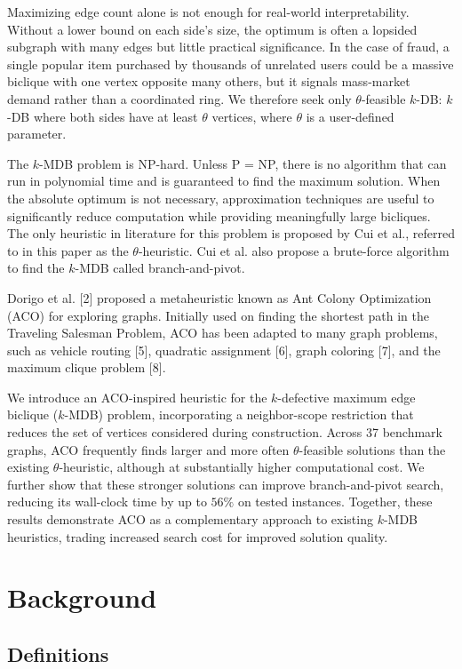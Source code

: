\documentclass[conference]{IEEEtran}
\begin{document}
Maximizing edge count alone is not enough for real-world interpretability. Without a lower bound on each side's size, the optimum is often a lopsided subgraph with many edges but little practical significance. In the case of fraud, a single popular item purchased by thousands of unrelated users could be a massive biclique with one vertex opposite many others, but it signals mass-market demand rather than a coordinated ring. We therefore seek only $\theta$-feasible \mbox{$k$-DB}: \mbox{$k$-DB} where both sides have at least $\theta$ vertices, where $\theta$ is a user-defined parameter.


The $k$-MDB problem is NP-hard. Unless P = NP, there is no algorithm that can run in polynomial time and is guaranteed to find the maximum solution. When the absolute optimum is not necessary, approximation techniques are useful to significantly reduce computation while providing meaningfully large bicliques. The only heuristic in literature for this problem is proposed by Cui et al., referred to in this paper as the $\theta$-heuristic. Cui et al. also propose a brute-force algorithm to find the $k$-MDB called branch-and-pivot.


Dorigo et al. [2] proposed a metaheuristic known as Ant Colony Optimization (ACO) for exploring graphs. Initially used on finding the shortest path in the Traveling Salesman Problem, ACO has been adapted to many graph problems, such as vehicle routing [5], quadratic assignment [6], graph coloring [7], and the maximum clique problem [8].


We introduce an ACO-inspired heuristic for the $k$-defective maximum edge biclique ($k$-MDB) problem, incorporating a neighbor-scope restriction that reduces the set of vertices considered during construction. Across 37 benchmark graphs, ACO frequently finds larger and more often $\theta$-feasible solutions than the existing $\theta$-heuristic, although at substantially higher computational cost. We further show that these stronger solutions can improve branch-and-pivot search, reducing its wall-clock time by up to $56\%$ on tested instances. Together, these results demonstrate ACO as a complementary approach to existing $k$-MDB heuristics, trading increased search cost for improved solution quality.


\section{Background}


\subsection{Definitions}
\end{document}
